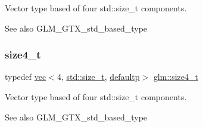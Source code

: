 Vector type based of four std\+::size\+\_\+t components. \begin{DoxySeeAlso}{See also}
G\+L\+M\+\_\+\+G\+T\+X\+\_\+std\+\_\+based\+\_\+type 
\end{DoxySeeAlso}
\mbox{\label{group__gtx__std__based__type_ga2bb2915bb83bb9d7a2967fe20aa7d2a5}} 
\subsubsection{\texorpdfstring{size4\+\_\+t}{size4\_t}}
{\footnotesize\ttfamily typedef \mbox{\hyperlink{structglm_1_1vec}{vec}}$<$4, \mbox{\hyperlink{_s_d_l__config__winrt_8h_a7c94ea6f8948649f8d181ae55911eeaf}{std\+::size\+\_\+t}}, \mbox{\hyperlink{namespaceglm_a36ed105b07c7746804d7fdc7cc90ff25a9d21ccd8b5a009ec7eb7677befc3bf51}{defaultp}}$>$ \mbox{\hyperlink{group__gtx__std__based__type_ga2bb2915bb83bb9d7a2967fe20aa7d2a5}{glm\+::size4\+\_\+t}}}

Vector type based of four std\+::size\+\_\+t components. \begin{DoxySeeAlso}{See also}
G\+L\+M\+\_\+\+G\+T\+X\+\_\+std\+\_\+based\+\_\+type 
\end{DoxySeeAlso}
